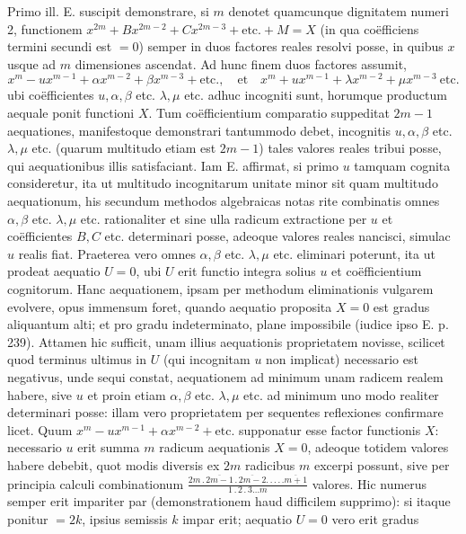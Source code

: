 Primo ill. E. suscipit demonstrare, si $m$ denotet quamcunque dignitatem
numeri 2, functionem $x^{2m}+Bx^{2m-2}+Cx^{2m-3}+\text{etc.}+M=X$ (in qua coëfficiens termini secundi est $=0$) semper in duos factores reales resolvi posse, in
quibus $x$ usque ad $m$ dimensiones ascendat. Ad hunc finem duos factores assumit,
\[
x^m-ux^{m-1}+\alpha x^{m-2}+\beta x^{m-3}+\text{etc.},\quad\text{et}\quad x^m+ux^{m-1}+\lambda x^{m-2}+\mu x^{m-3}\ \text{etc.}
\]
ubi coëfficientes $u,\alpha,\beta$ etc. $\lambda,\mu$ etc. adhuc incogniti sunt, horumque productum
aequale ponit functioni $X$. Tum coëfficientium comparatio suppeditat $2m-1$
aequationes, manifestoque demonstrari tantummodo debet, incognitis $u,\alpha,\beta$ etc.
$\lambda,\mu$ etc. (quarum multitudo etiam est $2m-1$) tales valores reales tribui posse, qui
aequationibus illis satisfaciant. Iam E. affirmat, si primo $u$ tamquam cognita
consideretur, ita ut multitudo incognitarum unitate minor sit quam multitudo
aequationum, his secundum methodos algebraicas notas rite combinatis omnes
$\alpha,\beta$ etc. $\lambda,\mu$ etc. rationaliter et sine ulla radicum extractione per $u$ et coëfficientes $B,C$ etc. determinari posse, adeoque valores reales nancisci, simulac $u$
realis fiat. Praeterea vero omnes $\alpha,\beta$ etc. $\lambda,\mu$ etc. eliminari poterunt, ita ut
prodeat aequatio $U=0$, ubi $U$ erit functio integra solius $u$ et coëfficientium
cognitorum. Hanc aequationem, ipsam per methodum eliminationis vulgarem evolvere, opus immensum foret, quando aequatio proposita $X=0$ est gradus aliquantum alti; et pro gradu indeterminato, plane impossibile (iudice ipso E. p. 239).
Attamen hic sufficit, unam illius aequationis proprietatem novisse, scilicet quod
terminus ultimus in $U$ (qui incognitam $u$ non implicat) necessario est negativus,
unde sequi constat, aequationem ad minimum unam radicem realem habere, sive
$u$ et proin etiam $\alpha,\beta$ etc. $\lambda,\mu$ etc. ad minimum uno modo realiter determinari
posse: illam vero proprietatem per sequentes reflexiones confirmare licet. Quum
$x^m-ux^{m-1}+\alpha x^{m-2}+\text{etc.}$ supponatur esse factor functionis $X$: necessario $u$
erit summa $m$ radicum aequationis $X=0$, adeoque totidem valores habere debebit, quot modis diversis ex $2m$ radicibus $m$ excerpi possunt, sive per principia calculi combinationum $\frac{2m\mathbin{.}\overline{2m-1}\mathbin{.}\overline{2m-2}.\,.\,.\,.\,.\overline{m+1}}{1\mathbin{.}2\mathbin{.}3\ldots m}$ valores. Hic numerus semper erit impariter par (demonstrationem haud difficilem supprimo): si itaque ponitur $=2k$, ipsius semissis $k$ impar erit; aequatio $U=0$ vero erit gradus
